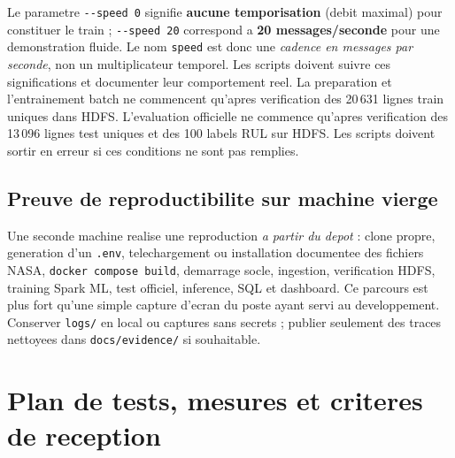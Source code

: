 \documentclass[10pt,a4paper]{article}
\newcommand{\code}[1]{{\small\ttfamily\nolinkurl{#1}}}
\begin{document}
Le parametre \code{--speed 0} signifie \textbf{aucune temporisation} (debit maximal) pour constituer le train ; \code{--speed 20} correspond a \textbf{20 messages/seconde} pour une demonstration fluide. Le nom \code{speed} est donc une \emph{cadence en messages par seconde}, non un multiplicateur temporel. Les scripts doivent suivre ces significations et documenter leur comportement reel. La preparation et l'entrainement batch ne commencent qu'apres verification des 20\,631 lignes train uniques dans HDFS. L'evaluation officielle ne commence qu'apres verification des 13\,096 lignes test uniques et des 100 labels RUL sur HDFS. Les scripts doivent sortir en erreur si ces conditions ne sont pas remplies.

\subsection{Preuve de reproductibilite sur machine vierge}
Une seconde machine realise une reproduction \emph{a partir du depot} : clone propre, generation d'un \code{.env}, telechargement ou installation documentee des fichiers NASA, \code{docker compose build}, demarrage socle, ingestion, verification HDFS, training Spark ML, test officiel, inference, SQL et dashboard. Ce parcours est plus fort qu'une simple capture d'ecran du poste ayant servi au developpement. Conserver \code{logs/} en local ou captures sans secrets ; publier seulement des traces nettoyees dans \code{docs/evidence/} si souhaitable.

\section{Plan de tests, mesures et criteres de reception}
\end{document}
